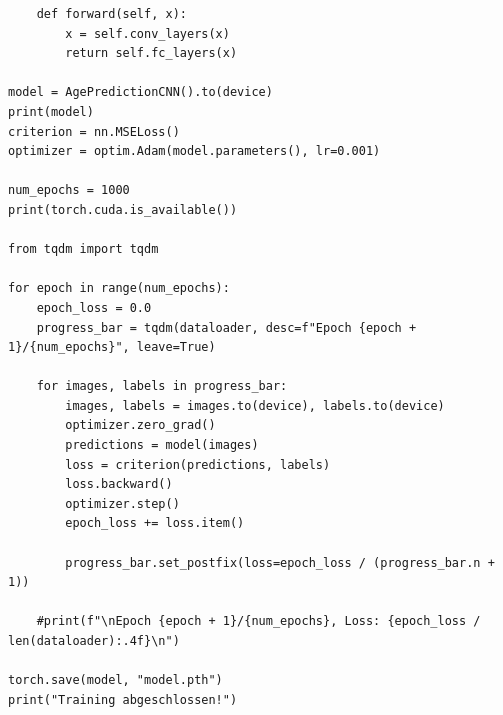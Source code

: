 \begin{verbatim}
    def forward(self, x):
        x = self.conv_layers(x)
        return self.fc_layers(x)

model = AgePredictionCNN().to(device)
print(model)
criterion = nn.MSELoss()
optimizer = optim.Adam(model.parameters(), lr=0.001)

num_epochs = 1000
print(torch.cuda.is_available())

from tqdm import tqdm

for epoch in range(num_epochs):
    epoch_loss = 0.0
    progress_bar = tqdm(dataloader, desc=f"Epoch {epoch + 1}/{num_epochs}", leave=True)

    for images, labels in progress_bar:
        images, labels = images.to(device), labels.to(device)
        optimizer.zero_grad()
        predictions = model(images)
        loss = criterion(predictions, labels)
        loss.backward()
        optimizer.step()
        epoch_loss += loss.item()

        progress_bar.set_postfix(loss=epoch_loss / (progress_bar.n + 1))

    #print(f"\nEpoch {epoch + 1}/{num_epochs}, Loss: {epoch_loss / len(dataloader):.4f}\n")

torch.save(model, "model.pth")
print("Training abgeschlossen!")
\end{verbatim}
